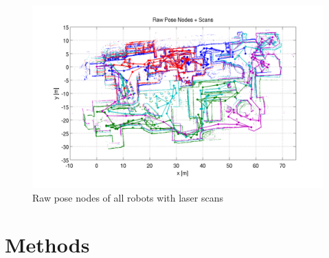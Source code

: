 \documentclass[twoside]{article}
\begin{document}
\begin{multicols}{2}
\begin{figure}[H]
\includegraphics[width=\columnwidth]{fig/raw_scan.pdf}
\caption{Raw pose nodes of all robots with laser scans}
\label{fig:raw_scan}
\end{figure}


\section{Methods}


\end{multicols}
\end{document}
